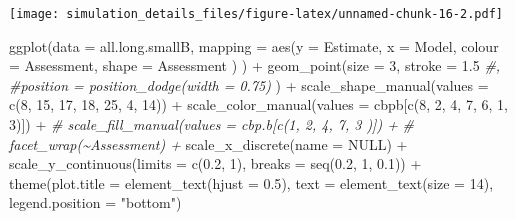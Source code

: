 \documentclass[
]{article}
\newenvironment{Shaded}{\begin{snugshade}}{\end{snugshade}}
\newcommand{\AttributeTok}[1]{\textcolor[rgb]{0.77,0.63,0.00}{#1}}
\newcommand{\CommentTok}[1]{\textcolor[rgb]{0.56,0.35,0.01}{\textit{#1}}}
\newcommand{\ConstantTok}[1]{\textcolor[rgb]{0.00,0.00,0.00}{#1}}
\newcommand{\DecValTok}[1]{\textcolor[rgb]{0.00,0.00,0.81}{#1}}
\newcommand{\FloatTok}[1]{\textcolor[rgb]{0.00,0.00,0.81}{#1}}
\newcommand{\FunctionTok}[1]{\textcolor[rgb]{0.00,0.00,0.00}{#1}}
\newcommand{\NormalTok}[1]{#1}
\newcommand{\SpecialCharTok}[1]{\textcolor[rgb]{0.00,0.00,0.00}{#1}}
\newcommand{\StringTok}[1]{\textcolor[rgb]{0.31,0.60,0.02}{#1}}
\begin{document}
\texttt{[image: simulation\_details\_files/figure-latex/unnamed-chunk-16-2.pdf]}

\begin{Shaded}
\begin{Highlighting}[]
\FunctionTok{ggplot}\NormalTok{(}\AttributeTok{data =}\NormalTok{ all.long.smallB,}
       \AttributeTok{mapping =} \FunctionTok{aes}\NormalTok{(}\AttributeTok{y =}\NormalTok{ Estimate,}
                     \AttributeTok{x =}\NormalTok{ Model, }
                     \AttributeTok{colour =}\NormalTok{ Assessment,}
                     \AttributeTok{shape =}\NormalTok{ Assessment}
\NormalTok{                     )}
\NormalTok{       ) }\SpecialCharTok{+}
  \FunctionTok{geom\_point}\NormalTok{(}\AttributeTok{size =} \DecValTok{3}\NormalTok{, }\AttributeTok{stroke =} \FloatTok{1.5}
             \CommentTok{\#,}
             \CommentTok{\#position = position\_dodge(width = 0.75)}
\NormalTok{             ) }\SpecialCharTok{+}
  \FunctionTok{scale\_shape\_manual}\NormalTok{(}\AttributeTok{values =} \FunctionTok{c}\NormalTok{(}\DecValTok{8}\NormalTok{, }\DecValTok{15}\NormalTok{, }\DecValTok{17}\NormalTok{, }\DecValTok{18}\NormalTok{, }\DecValTok{25}\NormalTok{, }\DecValTok{4}\NormalTok{, }\DecValTok{14}\NormalTok{)) }\SpecialCharTok{+}
  \FunctionTok{scale\_color\_manual}\NormalTok{(}\AttributeTok{values =}\NormalTok{ cbpb[}\FunctionTok{c}\NormalTok{(}\DecValTok{8}\NormalTok{, }\DecValTok{2}\NormalTok{, }\DecValTok{4}\NormalTok{, }\DecValTok{7}\NormalTok{, }\DecValTok{6}\NormalTok{, }\DecValTok{1}\NormalTok{, }\DecValTok{3}\NormalTok{)]) }\SpecialCharTok{+}
  \CommentTok{\# scale\_fill\_manual(values = cbp.b[c(1, 2, 4, 7, 3 )]) +}
  \CommentTok{\# facet\_wrap(\textasciitilde{}Assessment) +}
  \FunctionTok{scale\_x\_discrete}\NormalTok{(}\AttributeTok{name =} \ConstantTok{NULL}\NormalTok{) }\SpecialCharTok{+}
  \FunctionTok{scale\_y\_continuous}\NormalTok{(}\AttributeTok{limits =} \FunctionTok{c}\NormalTok{(}\FloatTok{0.2}\NormalTok{, }\DecValTok{1}\NormalTok{),}
                     \AttributeTok{breaks =} \FunctionTok{seq}\NormalTok{(}\FloatTok{0.2}\NormalTok{, }\DecValTok{1}\NormalTok{, }\FloatTok{0.1}\NormalTok{)) }\SpecialCharTok{+}
  \FunctionTok{theme}\NormalTok{(}\AttributeTok{plot.title =} \FunctionTok{element\_text}\NormalTok{(}\AttributeTok{hjust =} \FloatTok{0.5}\NormalTok{), }
        \AttributeTok{text =} \FunctionTok{element\_text}\NormalTok{(}\AttributeTok{size =} \DecValTok{14}\NormalTok{),}
        \AttributeTok{legend.position =} \StringTok{"bottom"}\NormalTok{)}
\end{Highlighting}
\end{Shaded}
\end{document}
